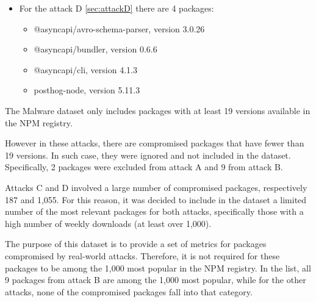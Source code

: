 \begin{itemize}
\begin{itemize}
            \item ember-browser-services, version 5.0.3
        \end{itemize}
    \item For the attack D \cref{sec:attackD} there are 4 packages:
        \begin{itemize}
            \item @asyncapi/avro-schema-parser, version 3.0.26
            \item @asyncapi/bundler, version 0.6.6
            \item @asyncapi/cli, version 4.1.3
            \item posthog-node, version 5.11.3
        \end{itemize}
\end{itemize}

The Malware dataset only includes packages with at least 19 versions available in the \ac{NPM} registry.

However in these attacks, there are compromised packages that have fewer than 19 versions. 
In such case, they were ignored and not included in the dataset.
Specifically, 2 packages were excluded from attack A and 9 from attack B.

Attacks C and D involved a large number of compromised packages, respectively 187 and 1,055.
For this reason, it was decided to include in the dataset a limited number of 
the most relevant packages for both attacks,
specifically those with a high number of weekly downloads (at least over 1,000).

The purpose of this dataset is to provide a set of metrics for 
packages compromised by real-world attacks. 
Therefore, it is not required for these packages to be among the 1,000 most popular in the \ac{NPM} registry.
In the list, all 9 packages from attack B are among the 1,000 most popular,
while for the other attacks, none of the compromised packages fall into that category.